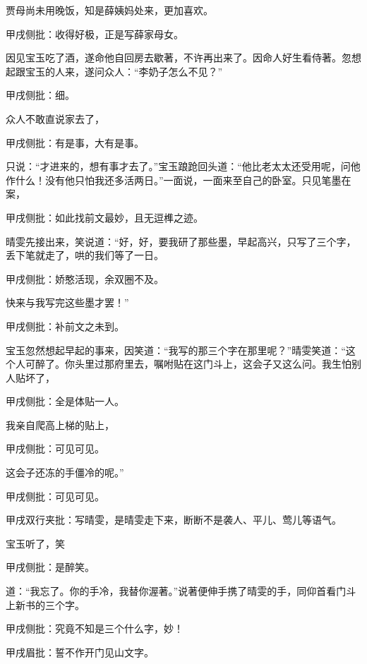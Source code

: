 \begin{parag}
    贾母尚未用晚饭，知是薛姨妈处来，更加喜欢。\begin{note}甲戌侧批：收得好极，正是写薛家母女。\end{note}因见宝玉吃了酒，遂命他自回房去歇著，不许再出来了。因命人好生看侍著。忽想起跟宝玉的人来，遂问众人：“李奶子怎么不见？”\begin{note}甲戌侧批：细。\end{note}众人不敢直说家去了，\begin{note}甲戌侧批：有是事，大有是事。\end{note}只说：“才进来的，想有事才去了。”宝玉踉跄回头道：“他比老太太还受用呢，问他作什么！没有他只怕我还多活两日。”一面说，一面来至自己的卧室。只见笔墨在案，\begin{note}甲戌侧批：如此找前文最妙，且无逗榫之迹。\end{note}晴雯先接出来，笑说道：“好，好，要我研了那些墨，早起高兴，只写了三个字，丢下笔就走了，哄的我们等了一日。\begin{note}甲戌侧批：娇憨活现，余双圈不及。\end{note}快来与我写完这些墨才罢！”\begin{note}甲戌侧批：补前文之未到。\end{note}宝玉忽然想起早起的事来，因笑道：“我写的那三个字在那里呢？”晴雯笑道：“这个人可醉了。你头里过那府里去，嘱咐贴在这门斗上，这会子又这么问。我生怕别人贴坏了，\begin{note}甲戌侧批：全是体贴一人。\end{note}我亲自爬高上梯的贴上，\begin{note}甲戌侧批：可见可见。\end{note}这会子还冻的手僵冷的呢。”\begin{note}甲戌侧批：可见可见。\end{note}\begin{note}甲戌双行夹批：写晴雯，是晴雯走下来，断断不是袭人、平儿、莺儿等语气。\end{note}宝玉听了，笑\begin{note}甲戌侧批：是醉笑。\end{note}道：“我忘了。你的手冷，我替你渥著。”说著便伸手携了晴雯的手，同仰首看门斗上新书的三个字。\begin{note}甲戌侧批：究竟不知是三个什么字，妙！\end{note}\begin{note}甲戌眉批：誓不作开门见山文字。\end{note}
\end{parag}


